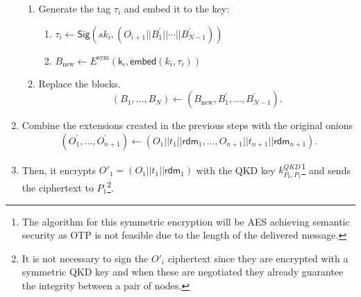 \documentclass[conference]{IEEEtran}
\begin{document}
\begin{enumerate}[label=\roman*.]
\begin{enumerate}
                \item Generate the tag $\tau_i$ and embed it to the key: 
                    \begin{enumerate}
                        \item $\tau_i \longleftarrow \mathsf{Sig}(sk_i, (O_{i+1} || B^\prime_1 || \cdots || B^\prime_{N-1}))$
                        
                        \item $B_{\text{new}} \leftarrow E^{\text{sym}}(\mathsf{k}_{i},\mathsf{embed}(k_i, \tau_i))$
                    \end{enumerate}
                
                \item Replace the blocks.
                \begin{equation*}
                    (B_1, \dots, B_N) \leftarrow (B_{\text{new}}, B^\prime_1,
                  \dots, B^\prime_{N - 1}).
                  \end{equation*}
        \end{enumerate}
      
    \item Combine the extensions created in the previous steps with the original onions
    \begin{equation*}
    (O^\prime_1, \dots, O_{n+1}^\prime) \leftarrow (O_1 || t_1 ||
        \mathsf{rdm}_1, \dots, O_{n+1} || t_{n+1} || \mathsf{rdm}_{n+1}).
        \end{equation*} 

    \item Then, it encrypts \(O'_1 = (O_1||t_1||\mathsf{rdm}_1)\) with the QKD key \(k^{QKD}_{P_0,P_1}\)\footnote{The algorithm for this symmetric encryption will be AES achieving semantic security as OTP is not feasible due to the length of the delivered message.} and sends the ciphertext to $P_1$\footnote{It is not necessary to sign the $O'_i$ ciphertext since they are encrypted with a symmetric QKD key and when these are negotiated they already guarantee the integrity between a pair of nodes.}.
\end{enumerate}
\end{document}
